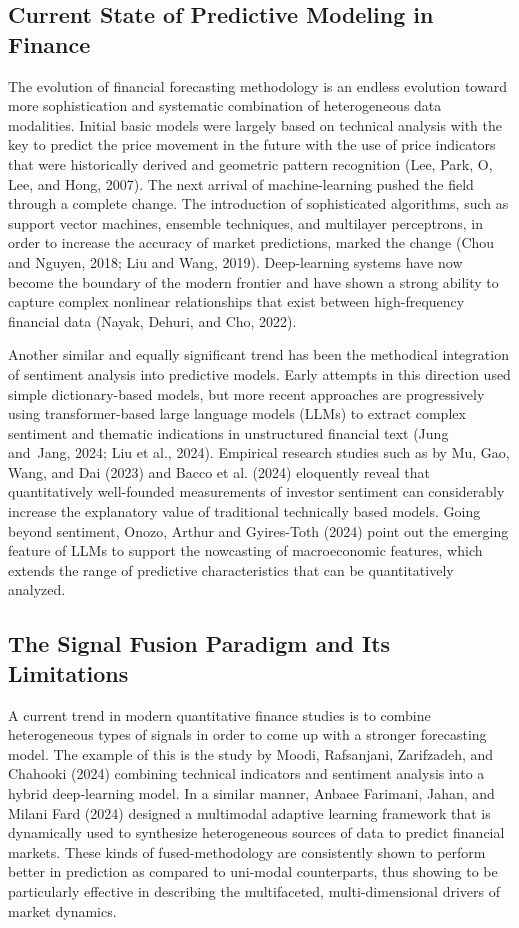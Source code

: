 \documentclass{singlecol-new}
\theoremstyle{TH}{
\newtheorem{lemma}{Lemma}
\newtheorem{theorem}[lemma]{Theorem}
\newtheorem{corrolary}[lemma]{Corrolary}
\newtheorem{conjecture}[lemma]{Conjecture}
\newtheorem{proposition}[lemma]{Proposition}
\newtheorem{claim}[lemma]{Claim}
\newtheorem{stheorem}[lemma]{Wrong Theorem}
\newtheorem{algorithm}{Algorithm}
}
\theoremstyle{THrm}{
\newtheorem{definition}{Definition}[section]
\newtheorem{question}{Question}[section]
\newtheorem{remark}{Remark}
\newtheorem{scheme}{Scheme}
}
\theoremstyle{THhit}{
\newtheorem{case}{Case}[section]
}
\begin{document}
\subsection{Current State of Predictive Modeling in Finance}

The evolution of financial forecasting methodology is an endless evolution toward more sophistication and systematic combination of heterogeneous data modalities. Initial basic models were largely based on technical analysis with the key to predict the price movement in the future with the use of price indicators that were historically derived and geometric pattern recognition (Lee, Park, O, Lee, and Hong, 2007). The next arrival of machine-learning pushed the field through a complete change. The introduction of sophisticated algorithms, such as support vector machines, ensemble techniques, and multilayer perceptrons, in order to increase the accuracy of market predictions, marked the change (Chou and Nguyen, 2018; Liu and Wang, 2019). Deep-learning systems have now become the boundary of the modern frontier and have shown a strong ability to capture complex nonlinear relationships that exist between high-frequency financial data (Nayak, Dehuri, and Cho, 2022).

Another similar and equally significant trend has been the methodical integration of sentiment analysis into predictive models. Early attempts in this direction used simple dictionary-based models, but more recent approaches are progressively using transformer-based large language models (LLMs) to extract complex sentiment and thematic indications in unstructured financial text (Jung and Jang, 2024; Liu et al., 2024). Empirical research studies such as by Mu, Gao, Wang, and Dai (2023) and Bacco et al. (2024) eloquently reveal that quantitatively well-founded measurements of investor sentiment can considerably increase the explanatory value of traditional technically based models. Going beyond sentiment, Onozo, Arthur and Gyires-Toth (2024) point out the emerging feature of LLMs to support the nowcasting of macroeconomic features, which extends the range of predictive characteristics that can be quantitatively analyzed.

\subsection{The Signal Fusion Paradigm and Its Limitations}

A current trend in modern quantitative finance studies is to combine heterogeneous types of signals in order to come up with a stronger forecasting model. The example of this is the study by Moodi, Rafsanjani, Zarifzadeh, and Chahooki (2024) combining technical indicators and sentiment analysis into a hybrid deep-learning model. In a similar manner, Anbaee Farimani, Jahan, and Milani Fard (2024) designed a multimodal adaptive learning framework that is dynamically used to synthesize heterogeneous sources of data to predict financial markets. These kinds of fused-methodology are consistently shown to perform better in prediction as compared to uni-modal counterparts, thus showing to be particularly effective in describing the multifaceted, multi-dimensional drivers of market dynamics.
\end{document}
